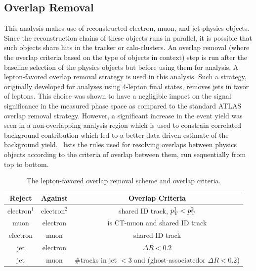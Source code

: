 \subsection{Overlap Removal}
This analysis makes use of reconstructed electron, muon, and jet physics objects. Since the reconstruction chains of these objects runs in parallel, it is possible that such objects share hits in the tracker or calo-clusters. An overlap removal (where the overlap criteria based on the type of objects in context) step is run after the baseline selection of the physics objects but before using them for analysis. A lepton-favored overlap removal strategy is used in this analysis. Such a strategy, originally developed for analyses using 4-lepton final states, removes jets in favor of leptons. This choice was shown to have a negligible impact on the signal significance in the measured phase space as compared to the standard ATLAS overlap removal strategy. However, a significant increase in the event yield was seen in a non-overlapping analysis region which is used to constrain correlated background contribution which led to a better data-driven estimate of the background yield.~ lists the rules used for resolving overlaps between physics objects according to the criteria of overlap between them, run sequentially from top to bottom.

\begin{table}[!ht]
    \centering\small
    \begin{tabular}{ccc}
        \hline\hline
        Reject & Against & Overlap Criteria \\
        \hline
        electron$^1$ & electron$^2$ & shared ID track, $p_\mathrm{T}^1 < p_\mathrm{T}^2$ \\
        muon & electron & is CT-muon and shared ID track \\
        electron & muon & shared ID track \\
        jet & electron & $\Delta R<0.2$ \\
        jet & muon & \#tracks in jet $<$3 and (ghost-associated\footnotemark or $\Delta R<0.2$) \\
        \hline\hline
    \end{tabular}
    \caption{The lepton-favored overlap removal scheme and overlap criteria.}
    \label{tab:overlap_removal}
\end{table}


